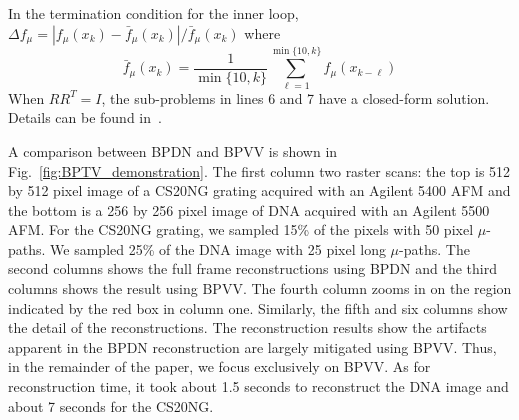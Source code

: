 \documentclass[twocolumn,oneside]{IEEEtran/IEEEtran}
\begin{document}
In the termination condition for the inner loop, $\Delta f_{\mu} = |f_{\mu}(x_k) - \bar{f}_{\mu}(x_k)|/\bar{f}_{\mu}(x_k)$ where
\begin{equation}
\bar{f}_{\mu}(x_k) = \frac{1}{\min\{10, k\}} \sum_{\ell=1}^{\min\{10,k\}} f_{\mu}(x_{k-\ell})
\end{equation}
When $RR^T=I$, the sub-problems in lines 6 and 7 have a closed-form solution. Details can be found in~\cite{becker_nesta_2011}.



A comparison between BPDN and BPVV is shown in
Fig.~\ref{fig:BPTV_demonstration}. The first column two raster scans: the top is 512 by 512 pixel image of a CS20NG grating acquired with an Agilent 5400 AFM and the bottom is a 256 by 256 pixel image of DNA acquired with an Agilent 5500 AFM.
For the CS20NG grating, we sampled 15\% of the pixels with 50 pixel $\mu$-paths. We sampled 25\% of the DNA image with 25 pixel long $\mu$-paths. The second columns shows the full frame reconstructions using BPDN and the third columns shows the result using BPVV. The fourth column zooms in on the region indicated by the red box in column one. Similarly, the fifth and six columns show the detail of the reconstructions. The reconstruction results show the artifacts apparent in the BPDN reconstruction are largely
mitigated using BPVV. Thus, in the remainder of the paper, we focus exclusively on BPVV. As for reconstruction time, it took about 1.5 seconds to reconstruct the DNA image and about 7 seconds for the CS20NG.
	

\end{document}
